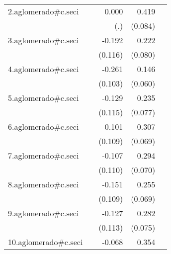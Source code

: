 {\begin{longtable}{l*{4}{D{.}{.}{-1}}}
\addlinespace
2.aglomerado#c.seci&                     &       0.000         &       0.419\sym{***}&                     \\
            &                     &         (.)         &     (0.084)         &                     \\
\addlinespace
3.aglomerado#c.seci&                     &      -0.192         &       0.222\sym{**} &                     \\
            &                     &     (0.116)         &     (0.080)         &                     \\
\addlinespace
4.aglomerado#c.seci&                     &      -0.261\sym{*}  &       0.146\sym{*}  &                     \\
            &                     &     (0.103)         &     (0.060)         &                     \\
\addlinespace
5.aglomerado#c.seci&                     &      -0.129         &       0.235\sym{**} &                     \\
            &                     &     (0.115)         &     (0.077)         &                     \\
\addlinespace
6.aglomerado#c.seci&                     &      -0.101         &       0.307\sym{***}&                     \\
            &                     &     (0.109)         &     (0.069)         &                     \\
\addlinespace
7.aglomerado#c.seci&                     &      -0.107         &       0.294\sym{***}&                     \\
            &                     &     (0.110)         &     (0.070)         &                     \\
\addlinespace
8.aglomerado#c.seci&                     &      -0.151         &       0.255\sym{***}&                     \\
            &                     &     (0.109)         &     (0.069)         &                     \\
\addlinespace
9.aglomerado#c.seci&                     &      -0.127         &       0.282\sym{***}&                     \\
            &                     &     (0.113)         &     (0.075)         &                     \\
\addlinespace
10.aglomerado#c.seci&                     &      -0.068         &       0.354\sym{***}&                     \\

\end{longtable}}
